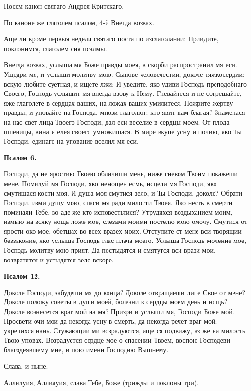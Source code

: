 Посем канон святаго Андрея Критскаго.

По каноне же глаголем псалом, 4-й Внегда возвах.

Аще ли кроме первыя недели святаго поста по изглаголании: Приидите, поклонимся, глаголем сия псалмы.

Внегда возвах, услыша мя Боже правды моея, в скорби распространил мя еси. Ущедри мя, и услыши молитву мою. Сынове человечестии, доколе тяжкосердии; вскую любите суетная, и ищете лжи; И уведите, яко удиви Господь преподобнаго Своего, Господь услышит мя внегда взову к Нему. Гневайтеся и не согрешайте, яже глаголете в сердцах ваших, на ложах ваших умилитеся. Пожрите жертву правды, и уповайте на Господа, мнози глаголют: кто явит нам благая? 3наменася на нас свет лица Твоего Господи, дал еси веселие в сердцы моем. От плода пшеницы, вина и елея своего умножишася. В мире вкупе усну и почию, яко Ты Господи, единаго на упование вселил мя еси.


\medskip


\bfseries Псалом 6.\normalfont{}


Господи, да не яростию Твоею обличиши мене, ниже гневом Твоим покажеши мене. Помилуй мя Господи, яко немощен есмь, исцели мя Господи, яко смутишася кости моя. И душа моя смутися зело, и Ты Господи, доколе? Обрати Господи, изми душу мою, спаси мя ради милости Твоея. Яко несть в смерти поминаяи Тебе, во аде же кто исповестьтися? Утрудихся воздыханием моим, измыю на всяку нощь ложе мое, слезами моими постелю мою омочу. Смутися от ярости око мое, обетшах во всех вразех моих. Отступите от мене вси творящии беззаконие, яко услыша Господь глас плача моего. Услыша Господь моление мое, Господь молитву мою прият. Да постыдятся и смятутся вси врази мои, возвратятся и устыдятся зело вскоре.


\medskip


\bfseries Псалом 12.\normalfont{}


Доколе Господи, забудеши мя до конца? Доколе отвращаеши лице Свое от мене? Доколе положу советы в души моей, болезни в сердцы моем день и нощь? Доколе вознесется враг мой на мя? Призри и услыши мя, Господи Боже мой. Просвети очи мои да некогда усну в смерть, да некогда речет враг мой: укрепихся нань. Стужающии ми возрадуются, аще ся подвижу, аз же на милость Твою уповах. Возрадуется сердце мое о спасении Твоем, воспою Господеви благодеявшему мне, и пою имени Господню Вышнему.

Слава, и ныне. 

Аллилуия, Аллилуия, слава Тебе, Боже (трижды и поклоны три). 

